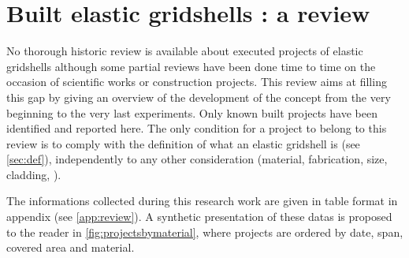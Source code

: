 %
\clearpage



\section{Built elastic gridshells : a review}

No thorough historic review is available about executed projects of elastic gridshells although some partial reviews have been done time to time on the occasion of scientific works or construction projects. This review aims at filling this gap by giving an overview of the development of the concept from the very beginning to the very last experiments. Only known built projects have been identified and reported here. The only condition for a project to belong to this review is to comply with the definition of what an elastic gridshell is (see \cref{sec:def}), independently to any other consideration (material, fabrication, size, cladding, \telp{}).

The informations collected during this research work are given in table format in appendix (see \cref{app:review}). A synthetic presentation of these datas is proposed to the reader in \cref{fig:projectsbymaterial}, where projects are ordered by date, span, covered area and material.

